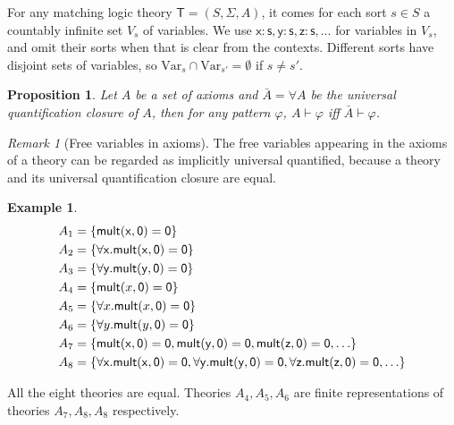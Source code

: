 \documentclass{article}
\newcounter{thmcounter}
\theoremstyle{plain}
\newtheorem{proposition}[thmcounter]{Proposition}
\theoremstyle{definition}
\newtheorem{example}[thmcounter]{Example}
\theoremstyle{remark}
\newtheorem{remark}[thmcounter]{Remark}
\begin{document}
For any matching logic theory $\mathsf{T} = (S, \Sigma, A)$, it comes for each sort $s \in S$ a countably infinite set $V_s$ of variables. We use $\mathsf{x:s}, \mathsf{y:s}, \mathsf{z:s}, \dots$ for variables in $V_s$, and omit their sorts when that is clear from the contexts. Different sorts have disjoint sets of variables, so $\mathrm{Var}_s \cap \mathrm{Var}_{s'} = \emptyset$ if $s \neq s'$.



\begin{proposition}
\label{prop:explicitly_universal_quantified_justification}
Let $A$ be a set of axioms and $\bar{A} = \forall A$ be the universal quantification closure of $A$, then for any pattern $\varphi$, $A \vdash \varphi$ iff $\bar{A} \vdash \varphi$.
\end{proposition}

\begin{remark}[Free variables in axioms]
\label{rmk:free_variables_in_axioms_are_universal_quantified}
The free variables appearing in the axioms of a theory can be regarded as implicitly universal quantified, because a theory and its universal quantification closure are equal.
\end{remark}

\begin{example}
  \begin{align*}
  A_1 &= \{{\sf mult(x, 0) = 0}\} \\
  A_2 &= \{{\sf \forall x . mult(x, 0) = 0}\} \\
  A_3 &= \{{\sf \forall y . mult(y, 0) = 0}\} \\
  A_4 &= \{\mathsf{mult}(x, \mathsf{0}) = \mathsf{0}\} \\
  A_5 &= \{\forall x . \mathsf{mult}(x, \mathsf{0}) = \mathsf{0}\} \\
  A_6 &= \{\forall y . \mathsf{mult}(y, \mathsf{0}) = \mathsf{0}\} \\
  A_7 &= \{{\sf mult(x, 0) = 0, mult(y, 0) = 0, mult(z, 0) = 0, \dots}\} \\
  A_8 &= \{{\sf \forall x . mult(x, 0) = 0, \forall y . mult(y, 0) = 0, \forall z . mult(z, 0) = 0, \dots}\}
  \end{align*}
  
  All the eight theories are equal. Theories $A_4, A_5, A_6$ are finite representations of theories $A_7, A_8, A_8$ respectively. 
\end{example}
\end{document}
